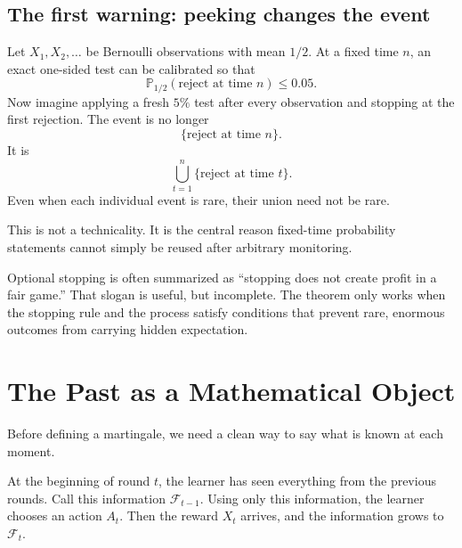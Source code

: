 \documentclass[en,nofont,11pt]{elegantbook}
\newcommand{\Pbb}{\mathbb{P}}
\newcommand{\F}{\mathcal{F}}
\begin{document}
\section{The first warning: peeking changes the event}

Let $X_1,X_2,\ldots$ be Bernoulli observations with mean $1/2$. At a fixed time $n$, an exact one-sided test can be calibrated so that
\[
\Pbb_{1/2}(\text{reject at time }n)\le 0.05.
\]
Now imagine applying a fresh $5\%$ test after every observation and stopping at the first rejection. The event is no longer
\[
\{\text{reject at time }n\}.
\]
It is
\[
\bigcup_{t=1}^{n}\{\text{reject at time }t\}.
\]
Even when each individual event is rare, their union need not be rare.

This is not a technicality. It is the central reason fixed-time probability statements cannot simply be reused after arbitrary monitoring.

\begin{thinkbox}
Optional stopping is often summarized as ``stopping does not create profit in a fair game.'' That slogan is useful, but incomplete. The theorem only works when the stopping rule and the process satisfy conditions that prevent rare, enormous outcomes from carrying hidden expectation.
\end{thinkbox}

\chapter{The Past as a Mathematical Object}

Before defining a martingale, we need a clean way to say what is known at each moment.

At the beginning of round $t$, the learner has seen everything from the previous rounds. Call this information $\F_{t-1}$. Using only this information, the learner chooses an action $A_t$. Then the reward $X_t$ arrives, and the information grows to $\F_t$.

\begin{center}
\end{center}
\end{document}
